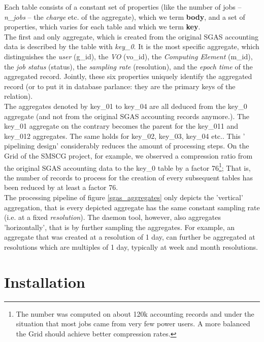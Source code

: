   Each table consists of a constant set of properties (like the number of jobs -- \emph{n\_jobs} --  
 the \emph{charge} etc. of the aggregate), which we term \textbf{body}, and a set of properties, 
 which varies for each table and which we term \textbf{key}.\\
 
 The first and only aggregate, which is created from the original SGAS accounting data is described by the table with  \emph{key\_0}. It is the   most specific aggregate, which distinguishes the \emph{user} 
 (g\_id), the \emph{VO} (vo\_id), the \emph{Computing Element} (m\_id), the \emph{job status}
  (status), the \emph{sampling rate} (resolution), and the \emph{epoch time} of the aggregated
   record. Jointly, these six properties uniquely identify the aggregated record (or to put it in database parlance: 
   they are the primary keys of the relation).\\
   The aggregates denoted by key\_01 to  key\_04 are all deduced from the key\_0 aggregate 
   (and not from the original SGAS accounting records anymore.). The key\_01 aggregate on the 
   contrary becomes the parent for the key\_011 and key\_012 aggregates. The same holds for 
   key\_02, key\_03, key\_04 etc.. This ' pipelining design' considerably reduces the amount of
    processing steps.  On the Grid of the SMSCG project, for example, we observed a compression 
    ratio from the original SGAS accounting data to the key\_0 table by a factor 76\footnote{The number 
    was computed on about 120k accounting records and under the situation that most jobs came from 
    very few power users. A more balanced the Grid should achieve better compression rates. }; That is, 
    the number of records to process for the creation of every subsequent tables has been reduced by at 
    least a factor 76.\\

The processing pipeline of figure \ref{sgas_aggregates} only depicts the 'vertical' aggregation, that is 
every depicted aggregate has the same  constant sampling rate (i.e. at a fixed \emph{resolution}).  The 
daemon tool, however, also aggregates 'horizontally', that is by further sampling the aggregates. For example, 
an aggregate that was created at a resolution of 1 day, can further be aggregated at resolutions which are 
multiples of 1 day, typically at  week and month resolutions.  
  
  \section{Installation}
  \label{sec:installation}
  
